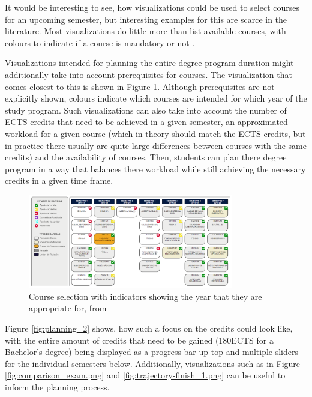 It would be interesting to see, how visualizations could be used to select courses for an upcoming semester, but interesting examples for this are scarce in the literature. Most visualizations do little more than list available courses, with colours to indicate if a course is mandatory or not \cite{Dashboard-StudentProgress}.

Visualizations intended for planning the entire degree program duration might additionally take into account prerequisites for courses. The visualization that comes closest to this is shown in Figure \ref{fig:planning}. Although prerequisites are not explicitly shown, colours indicate which courses are intended for which year of the study program.
Such visualizations can also take into account the number of ECTS credits that need to be achieved in a given semester, an approximated workload for a given course (which in theory should match the ECTS credits, but in practice there usually are quite large differences between courses with the same credits) and the availability of courses. Then, students can plan there degree program in a way that balances there workload while still achieving the necessary credits in a given time frame.

\begin{figure}
    \centering
    \includegraphics[width=0.8\textwidth]{figures/planning.png}
    \caption{Course selection with indicators showing the year that they are appropriate for, from \cite{LISSA-Planning}}
    \label{fig:planning}
\end{figure}



Figure \ref{fig:planning_2} shows, how such a focus on the credits could look like, with the entire amount of credits that need to be gained (180ECTS for a Bachelor's degree) being displayed as a progress bar up top and multiple sliders for the individual semesters below.
Additionally, visualizations such as in Figure \ref{fig:comparison_exam.png} and \ref{fig:trajectory-finish_1.png} can be useful to inform the planning process.

